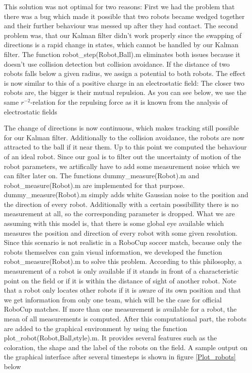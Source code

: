 This solution was not optimal for two reasons: First we had the problem that there was a bug which made it possible that two robots became wedged together and their further behaviour was messed up after they had contact. The second problem was, that our Kalman filter didn't work properly since the swapping of directions is a rapid change in states, which cannot be handled by our Kalman filter. The function {\selectfont robot\_step(Robot,Ball).m} eliminates both issues because it doesn't use collision detection but collision avoidance. If the distance of two robots falls below a given radius, we assign a potential to both robots. The effect is now similar to this of a positive charge in an electrostatic field: The closer two robots are, the bigger is their mutual repulsion. As you can see below, we use the same \(r^{-2}\)-relation for the repulsing force as it is known from the analysis of electrostatic fields



The change of directions is now continuous, which makes tracking still possible for our Kalman filter. Additionally to the collision avoidance, the robots are now attracted to the ball if it near them. Up to this point we computed the behaviour of an ideal robot. Since our goal is to filter out the uncertainty of motion of the robot parameters, we artifically have to add some measurement noise which we can filter later on. The functions {\selectfont dummy\_measure(Robot).m} and {\selectfont robot\_measure(Robot).m} are implemented for that purpose. {\selectfont dummy\_measure(Robot).m} simply adds white Gaussian noise to the position and the direction of every robot. Additionally with a certain possibillity there is no measurement at all, so the corresponding parameter is dropped. What we are assuming with this model is, that there is some global eye available which measures the position and direction of every robot with some given resolution. Since this scenario is not realistic in a RoboCup soccer match, because only the robots themselves can gain visual information, we developed the function {\selectfont robot\_measure(Robot).m} to solve this problem. According to this philosophy, a measurement of a robot is only available if it stands in front of a characteristic point on the field or if it is within the distance of sight of another robot. Note that a robot only locates other robots if it is aware of its own position and that we get information from only one team, which will be the case for official RoboCup matches. If more than one measurement is available for a robot, the mean of all measurements is computed.
\parskip 10pt
After this computational part, the robots are added to the graphical environment by using the function
{\selectfont plot\_robot(Robot,Ball,style).m}. It provides several features such as the coloration, the shape and the label of the robots on the field. A sample output on the graphical interface after several timesteps is shown in figure \ref{Plot_robots} below

